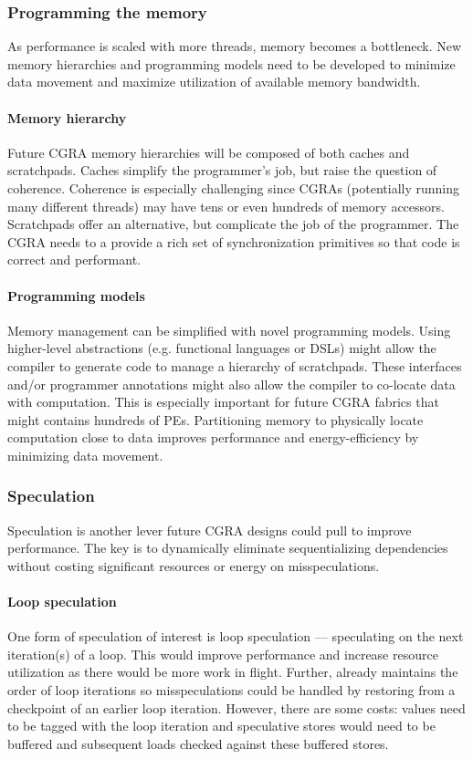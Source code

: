 \subsubsection{Programming the memory}
As performance is scaled with more threads, memory becomes a bottleneck.
% 
New memory hierarchies and programming models need to be developed to minimize data movement and maximize utilization of available memory bandwidth.

\paragraph{Memory hierarchy}
Future CGRA memory hierarchies will be composed of both caches and scratchpads.
% 
Caches simplify the programmer's job, but raise the question of coherence.
% 
Coherence is especially challenging since CGRAs (potentially running many different threads) may have tens or even hundreds of memory accessors.
% 
Scratchpads offer an alternative, but complicate the job of the programmer.
% 
The CGRA needs to a provide a rich set of synchronization primitives so that code is correct and performant.

\paragraph{Programming models}
Memory management can be simplified with novel programming models.
% 
Using higher-level abstractions (e.g. functional languages or DSLs) might allow the compiler to generate code to manage a hierarchy of scratchpads.
%
These interfaces and/or programmer annotations might also allow the compiler to co-locate data with computation.
% 
This is especially important for future CGRA fabrics that might contains hundreds of PEs.
% 
Partitioning memory to physically locate computation close to data improves performance and energy-efficiency by minimizing data movement.

\subsubsection{Speculation}
Speculation is another lever future CGRA designs could pull to improve performance.
%
The key is to dynamically eliminate sequentializing dependencies without costing significant resources or energy on misspeculations.

\paragraph{Loop speculation}
One form of speculation of interest is loop speculation --- speculating on the next iteration(s) of a loop.
% 
This would improve performance and increase resource utilization as there would be more work in flight.
% 
Further, \riptide already maintains the order of loop iterations so misspeculations could be handled by restoring from a checkpoint of an earlier loop iteration.
% 
However, there are some costs: values need to be tagged with the loop iteration and speculative stores would need to be buffered and subsequent loads checked against these buffered stores.

